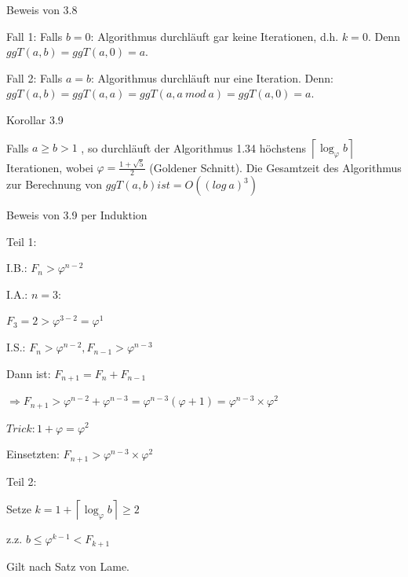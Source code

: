\documentclass[10pt]{beamer}
\begin{document}
\begin{frame}{Beweis von 3.8}

Fall 1: Falls $ b= 0$: Algorithmus durchläuft gar keine Iterationen, d.h. $k=0$. Denn $ggT(a,b)= ggT(a,0)= a$.

\vspace{0.2cm}
\noindent Fall 2: Falls $a=b$: Algorithmus durchläuft nur eine Iteration. Denn: $ggT(a,b)= ggT(a,a)= ggT(a, a \ mod \ a)= ggT(a, 0) = a$.
    
\end{frame}

\begin{frame}{Korollar 3.9}

Falls $a \geq b > 1 $ , so durchläuft der Algorithmus 1.34 höchstens $\left\lceil \log_{\varphi} b \right\rceil$ Iterationen, wobei $\varphi = \frac{1 + \sqrt{5}}{2}$  (Goldener Schnitt).
Die Gesamtzeit des Algorithmus zur Berechnung von $ggT(a,b) ist = O ((log \ a)^3)$
    
\end{frame}

\begin{frame}{Beweis von 3.9 per Induktion}

Teil 1: 

\vspace{0.4cm}
 I.B.: $ F_n > \varphi ^{n-2}$


\vspace{0.3cm}
\indent I.A.: $ n=3: $

$F_3= 2 > \varphi ^ {3-2} = \varphi ^1$


\vspace{=0.3cm}


I.S.: $ F_n > \varphi ^{n-2}, F_{n-1} > \varphi ^ {n-3}$


\vspace{0.15cm}
Dann ist: $ F_{n+1}= F_n + F_ {n-1}$ 

$\Rightarrow F_{n+1} > \varphi ^{n-2} + \varphi ^ {n-3} = \varphi ^ {n-3} ( \varphi +1) = \varphi ^ {n-3} \times \varphi ^2$


\vspace{0.15cm}
 $Trick: 1+ \varphi = \varphi^2 $


 \vspace{0.15cm}
 Einsetzten: $F_{n+1} > \varphi ^{n-3} \times \varphi ^2$

    
\end{frame}


\begin{frame}

    Teil 2: 

\vspace{0.3cm}
 Setze $k= 1 + \left\lceil \log_{\varphi} b \right\rceil \geq 2$ 

 z.z. $b \leq  \varphi ^{k-1} < F_{k+1}$ 
 
\vspace{0.15cm}
 Gilt nach Satz von Lame.

\end{frame}
\end{document}
